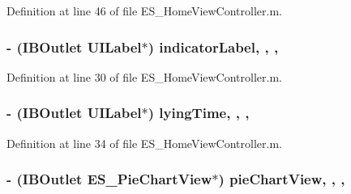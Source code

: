 Definition at line 46 of file E\+S\+\_\+\+Home\+View\+Controller.\+m.

\hypertarget{category_e_s___home_view_controller_07_08_acf6fcace1d5e7b52cecd8d297169806b}{
\subsubsection[{indicator\+Label}]{\setlength{\rightskip}{0pt plus 5cm}-\/ (I\+B\+Outlet U\+I\+Label$\ast$) indicator\+Label\hspace{0.3cm}{\ttfamily [read]}, {\ttfamily [write]}, {\ttfamily [nonatomic]}, {\ttfamily [weak]}}}\label{category_e_s___home_view_controller_07_08_acf6fcace1d5e7b52cecd8d297169806b}


Definition at line 30 of file E\+S\+\_\+\+Home\+View\+Controller.\+m.

\hypertarget{category_e_s___home_view_controller_07_08_af055de6fe1c67f984f38e374cc658354}{
\subsubsection[{lying\+Time}]{\setlength{\rightskip}{0pt plus 5cm}-\/ (I\+B\+Outlet U\+I\+Label$\ast$) lying\+Time\hspace{0.3cm}{\ttfamily [read]}, {\ttfamily [write]}, {\ttfamily [nonatomic]}, {\ttfamily [weak]}}}\label{category_e_s___home_view_controller_07_08_af055de6fe1c67f984f38e374cc658354}


Definition at line 34 of file E\+S\+\_\+\+Home\+View\+Controller.\+m.

\hypertarget{category_e_s___home_view_controller_07_08_a5fa6685e799c5d5d9e6ad9f7f97fd4ab}{
\subsubsection[{pie\+Chart\+View}]{\setlength{\rightskip}{0pt plus 5cm}-\/ (I\+B\+Outlet {\bf E\+S\+\_\+\+Pie\+Chart\+View}$\ast$) pie\+Chart\+View\hspace{0.3cm}{\ttfamily [read]}, {\ttfamily [write]}, {\ttfamily [nonatomic]}, {\ttfamily [weak]}}}\label{category_e_s___home_view_controller_07_08_a5fa6685e799c5d5d9e6ad9f7f97fd4ab}


